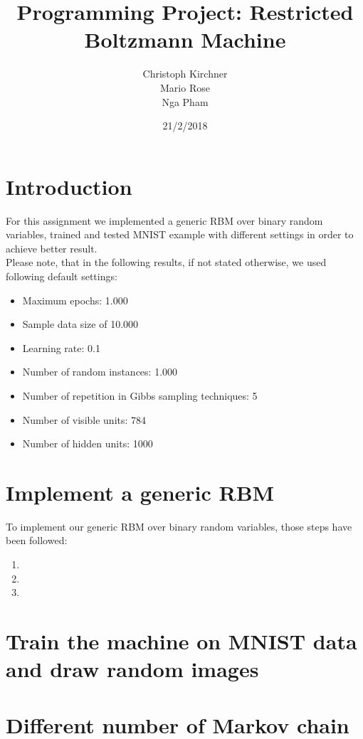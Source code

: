 \documentclass[a4paper]{article}
\title{Programming Project: Restricted Boltzmann Machine}
\author{Christoph Kirchner\\Mario Rose\\Nga Pham}
\date{21/2/2018}
\begin{document}
\maketitle
\section{Introduction}
For this assignment we implemented a generic RBM over binary random variables, trained and tested MNIST example with different settings in order to achieve better result.\\
Please note, that in the following results, if not stated otherwise, we used following default settings:
\begin{itemize}
    \item Maximum epochs: 1.000
    \item Sample data size of 10.000
    \item Learning rate: 0.1
    \item Number of random instances: 1.000
    \item Number of repetition in Gibbs sampling techniques: 5
    \item Number of visible units: 784
    \item Number of hidden units: 1000
\end{itemize}

\section{Implement a generic RBM}
To implement our generic RBM over binary random variables, those steps have been followed:
\begin{enumerate}
    \item 
    
    \item 
    
    \item 
\end{enumerate}

\section{Train the machine on MNIST data and draw random images}

\section{Different number of Markov chain}
\end{document}

